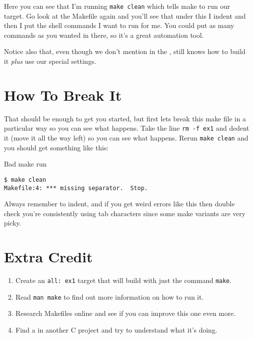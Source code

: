 Here you can see that I'm running \verb|make clean| which tells
make to run our  target.  Go look at the Makefile
again and you'll see that under this I indent and then I put
the shell commands I want  to run for me.  You could
put as many commands as you wanted in there, so it's a great
automation tool.

Notice also that, even though we don't mention  in the
,  still knows how to build it \emph{plus}
use our special settings.


\section{How To Break It}

That should be enough to get you started, but first lets break this 
make file in a particular way so you can see what happens.  Take
the line \verb|rm -f ex1| and dedent it (move it all the way left)
so you can see what happens.  Rerun \verb|make clean| and you should
get something like this:

\begin{Terminal}{Bad make run}
\begin{lstlisting}
$ make clean
Makefile:4: *** missing separator.  Stop.
\end{lstlisting}
\end{Terminal}

Always remember to indent, and if you get weird errors like this
then double check you're consistently using tab characters since
some make variants are very picky.

\section{Extra Credit}

\begin{enumerate}
\item Create an \verb|all: ex1| target that will build  with
    just the command \verb|make|.
\item Read \verb|man make| to find out more information on how to run it.
\item Research Makefiles online and see if you can improve this one even more.
\item Find a  in another C project and try to understand
    what it's doing.
\end{enumerate}

